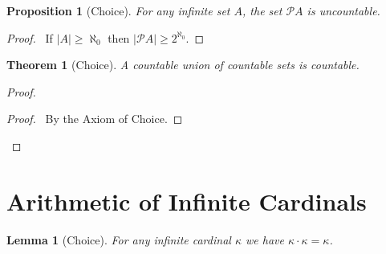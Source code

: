 \documentclass{article}
\let\qed\relax
\newtheorem{lemma}[axiom]{Lemma}
\newtheorem{proposition}[axiom]{Proposition}
\newtheorem{theorem}[axiom]{Theorem}
\theoremstyle{definition}
\begin{document}
    \begin{proposition}[Choice]
        For any infinite set $A$, the set $\mathcal{P} A$ is uncountable.
    \end{proposition}

    \begin{proof}
        \pf\ If $|A| \geq \aleph_0$ then $|\mathcal{P} A| \geq 2^{\aleph_0}$. \qed
    \end{proof}

    \begin{theorem}[Choice]
        A countable union of countable sets is countable.
    \end{theorem}

    \begin{proof}
        \pf
        \begin{proof}
            \pf\ By the Axiom of Choice.
        \end{proof}
        \qed
    \end{proof}
    
    \section{Arithmetic of Infinite Cardinals}

    \begin{lemma}[Choice]
        For any infinite cardinal $\kappa$ we have $\kappa \cdot \kappa = \kappa$.
    \end{lemma}
\end{document}
